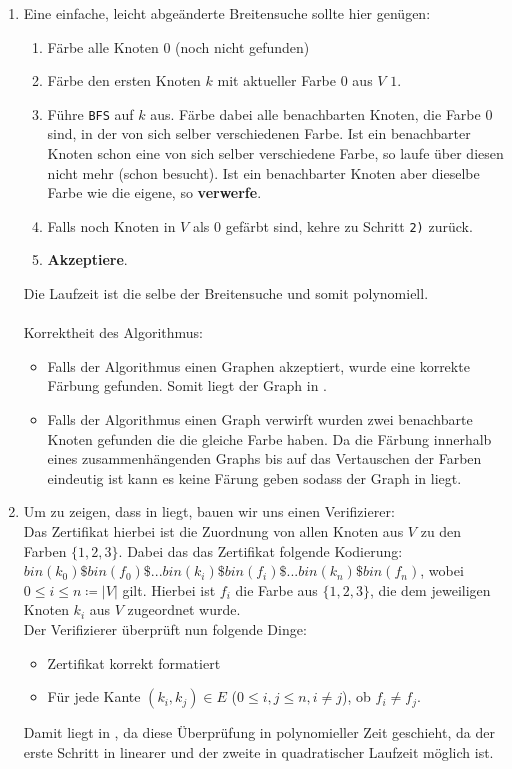 \documentclass[a4paper,11pt]{scrartcl}
\begin{document}
\begin{enumerate}[label=\alph*)]
	\item	Eine einfache, leicht abgeänderte Breitensuche sollte hier genügen:
		\begin{enumerate}[label=\arabic*)]
		\item Färbe alle Knoten $0$ (noch nicht gefunden)
		\item Färbe den ersten Knoten $k$ mit aktueller Farbe $0$ aus $V$ $1$.
		\item Führe \verb|BFS| auf $k$ aus. Färbe dabei alle benachbarten Knoten, die Farbe $0$ sind, in der von sich selber verschiedenen Farbe. Ist ein benachbarter Knoten schon eine von sich selber verschiedene Farbe, so laufe über diesen nicht mehr (schon besucht). Ist ein benachbarter Knoten aber dieselbe Farbe wie die eigene, so \textbf{verwerfe}.
		\item Falls noch Knoten in $V$ als $0$ gefärbt sind, kehre zu Schritt \verb|2)| zurück.
		\item \textbf{Akzeptiere}.
		\end{enumerate}
		Die Laufzeit ist die selbe der Breitensuche und somit polynomiell.\\
		\\
		Korrektheit des Algorithmus:
		\begin{itemize}
		\item Falls der Algorithmus einen Graphen akzeptiert, wurde eine korrekte Färbung gefunden. Somit liegt der Graph in .
		\item Falls der Algorithmus einen Graph verwirft wurden zwei benachbarte Knoten gefunden die die gleiche Farbe haben. Da die Färbung innerhalb eines zusammenhängenden Graphs bis auf das Vertauschen der Farben eindeutig ist kann es keine Färung geben sodass der Graph in  liegt.
		\end{itemize}
		
	\item	Um zu zeigen, dass  in  liegt, bauen wir uns einen Verifizierer:\\
		Das Zertifikat hierbei ist die Zuordnung von allen Knoten aus $V$ zu den Farben $\{1,2,3\}$. Dabei das das Zertifikat folgende Kodierung:\\
		$bin(k_0)\$bin(f_0)\$...bin(k_i)\$bin(f_i)\$...bin(k_n)\$bin(f_n)$, wobei $0\leq i \leq n \coloneqq \vert V \vert$ gilt. Hierbei ist $f_i$ die Farbe aus $\{1,2,3\}$, die dem jeweiligen Knoten $k_i$ aus $V$ zugeordnet wurde.\\
		Der Verifizierer überprüft nun folgende Dinge:
		\begin{itemize}
		\item Zertifikat korrekt formatiert
		\item Für jede Kante $(k_i,k_j) \in E$ ($0\leq i,j \leq n, i \neq j$), ob $f_i \neq f_j$.
		\end{itemize}
		Damit liegt  in \NP, da diese Überprüfung in polynomieller Zeit geschieht, da der erste Schritt in linearer und der zweite in quadratischer Laufzeit möglich ist.
		
	\end{enumerate}
	
\end{document}
